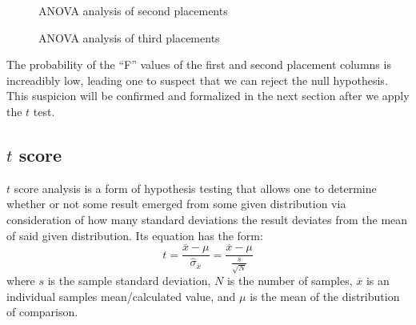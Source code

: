 \begin{figure}[H]
\caption{ANOVA analysis of second placements}
\end{figure}

\begin{figure}[H]
\caption{ANOVA analysis of third placements}
\end{figure}

The probability of the ``F'' values of the first and second placement columns is
increadibly low, leading one to suspect that we can reject the null hypothesis.
This suspicion will be confirmed and formalized in the next section after we
apply the $t$ test.

\subsection{$t$ score}
$t$ score analysis is a form of hypothesis testing that allows one to determine
whether or not some result emerged from some given distribution via consideration
of how many standard deviations the result deviates from the mean of said given
distribution. Its equation has the form:
$$t =\frac{\overline{x}-\mu}{\hat{\sigma}_{\overline{x}}} = \frac{\overline{x}-\mu}{\frac{s}{\sqrt{N}}}$$
where $s$ is the sample standard deviation, $N$ is the number of samples,
$\overline{x}$ is an individual samples mean/calculated value, and $\mu$ is
the mean of the distribution of comparison.

